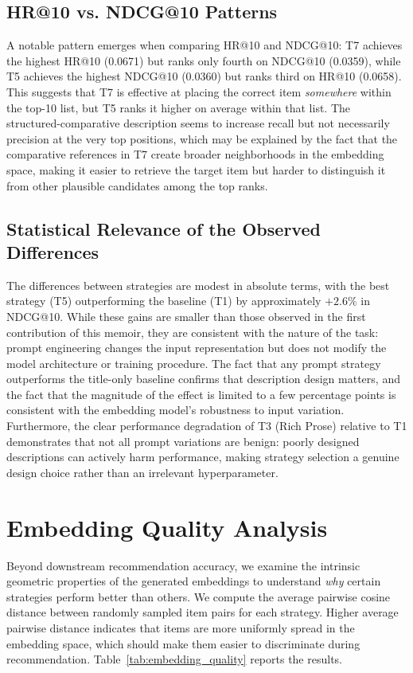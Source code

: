 \documentclass[12pt,a4paper]{report}
\begin{document}
\subsection*{HR@10 vs. NDCG@10 Patterns}

A notable pattern emerges when comparing HR@10 and NDCG@10: T7 achieves the
highest HR@10 (0.0671) but ranks only fourth on NDCG@10 (0.0359), while T5
achieves the highest NDCG@10 (0.0360) but ranks third on HR@10 (0.0658). This
suggests that T7 is effective at placing the correct item \emph{somewhere}
within the top-10 list, but T5 ranks it higher on average within that list.
The structured-comparative description seems to increase recall but not
necessarily precision at the very top positions, which may be explained by the
fact that the comparative references in T7 create broader neighborhoods in the
embedding space, making it easier to retrieve the target item but harder to
distinguish it from other plausible candidates among the top ranks.

\subsection*{Statistical Relevance of the Observed Differences}

The differences between strategies are modest in absolute terms, with the
best strategy (T5) outperforming the baseline (T1) by approximately
$+2.6\%$ in NDCG@10. While these gains are smaller than those observed
in the first contribution of this memoir, they are consistent with the
nature of the task: prompt engineering changes the input representation
but does not modify the model architecture or training procedure. The
fact that any prompt strategy outperforms the title-only baseline
confirms that description design matters, and the fact that the
magnitude of the effect is limited to a few percentage points is
consistent with the embedding model's robustness to input variation.
Furthermore, the clear performance degradation of T3 (Rich Prose)
relative to T1 demonstrates that not all prompt variations are benign:
poorly designed descriptions can actively harm performance, making
strategy selection a genuine design choice rather than an irrelevant
hyperparameter.

\section{Embedding Quality Analysis}
\label{sec:embedding_quality}

Beyond downstream recommendation accuracy, we examine the intrinsic geometric
properties of the generated embeddings to understand \emph{why} certain
strategies perform better than others. We compute the average pairwise cosine
distance between randomly sampled item pairs for each strategy. Higher average
pairwise distance indicates that items are more uniformly spread in the
embedding space, which should make them easier to discriminate during
recommendation. Table~\ref{tab:embedding_quality} reports the results.
\end{document}

